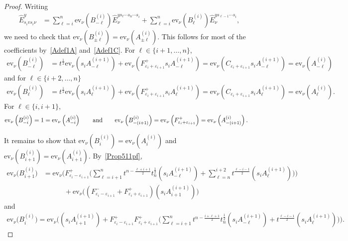 \documentclass[11pt]{article}
\theoremstyle{plain}
\theoremstyle{definition}
\theoremstyle{remark}
\numberwithin{equation}{section}
\def\ev{\mathrm{ev}}
\newcounter{r}
\newcounter{s}
\begin{document}
\begin{proof}
Writing
\begin{align*}
\widehat{E}^y_{s_ivs_i\nu}
&= \sum_{\ell=i}^n \ev_\nu(B^{(i)}_{-\ell})\widehat{E}_\nu^{ys_\ell\cdots s_n\cdots s_i}
+ \sum_{\ell=i}^n \ev_\nu(B^{(i)}_{\ell})\widehat{E}_\nu^{ys_{\ell-1}\cdots s_i},
\end{align*}
we need to check that $\ev_\nu(B^{(i)}_{\pm\ell}) = \ev_\nu(A^{(i)}_{\pm\ell})$. 
This follows for most of the coefficients by~\eqref{Adef1A} and~\eqref{Adef1C}. For $\ell \in \{i+1,\ldots, n\}$,
\begin{align*}
\ev_\nu\left(B^{(i)}_{-\ell}\right)
&= t^{\frac12}\ev_\nu\left(s_iA^{(i+1)}_{-\ell}\right) + \ev_\nu\left(F_{\varepsilon_i+\varepsilon_{i+1}}^+ s_iA^{(i+1)}_{-\ell}\right) 
= \ev_\nu\left(C_{\varepsilon_i+\varepsilon_{i+1}} s_iA^{(i+1)}_{-\ell}\right) 
= \ev_\nu\left(A^{(i)}_{-\ell}\right)
\end{align*}
and for $\ell \in \{i+2,\ldots, n\}$
\begin{align*}
\ev_\nu\left(B^{(i)}_{\ell}\right)
&= t^{\frac12}\ev_\nu \left(s_iA^{(i+1)}_{\ell}\right) + \ev_\nu\left(F_{\varepsilon_i+\varepsilon_{i+1}}^+ s_iA^{(i+1)}_{\ell}\right) 
= \ev_\nu\left(C_{\varepsilon_i+\varepsilon_{i+1}} s_iA^{(i+1)}_{\ell}\right) 
= \ev_\nu\left(A^{(i)}_{\ell}\right).
\end{align*}
For $\ell\in\{i, i+1\}$,
\begin{align*}
\ev_\nu\left(B^{(i)}_{-i}\right) 
&= 1 = \ev_\nu\left(A^{(i)}_{-i}\right) \qquad\hbox{and}\qquad
\ev_\nu\left(B^{(i)}_{-(i+1)} \right) 
=\ev_\nu\left(F_{\varepsilon_i+\varepsilon_{i+1}}^+\right)
=\ev_\nu\left(A^{(i)}_{-(i+1)} \right).
\end{align*}

It remains to show that
$\ev_\nu(B^{(i)}_{i})=\ev_\nu(A^{(i)}_{i})$ and $\ev_\nu(B^{(i)}_{i+1}) = \ev_\nu(A^{(i)}_{i+1})$.
By~\eqref{Prop511pf},
\begin{align*}
\ev_\nu\Big(B^{(i)}_{i+1} \Big)
&= \ev_\nu\Big( F_{\varepsilon_i-\varepsilon_{i+1}}^+ 
\Big(\sum_{\ell = i+1}^n t^{n-\frac{\ell+i+1}{2}} t_n^{\frac12} (s_iA^{(i+1)}_{-\ell})
+\sum_{\ell = n}^{i+2} t^{\frac{\ell-i-1}{2}}  (s_iA^{(i+1)}_{\ell})\Big)\Big)
\\
&\qquad\quad
+ \ev_\nu\Big(\left(F_{\varepsilon_i-\varepsilon_{i+1}}^- +F_{\varepsilon_i+\varepsilon_{i+1}}^+\right)(s_iA^{(i+1)}_{i+1})\Big)
\end{align*}
and 
\begin{align*}
\ev_\nu\Big(B^{(i)}_i \Big)
= \ev_\nu\Big((s_iA^{(i+1)}_{i+1})
+F_{\varepsilon_i-\varepsilon_{i+1}}^+ F_{\varepsilon_i+\varepsilon_{i+1}}^+
\Big(\sum_{\ell=i+1}^n t^{n-\frac{i+\ell+1}{2}}t_n^{\frac12} (s_iA^{(i+1)}_{-\ell}) 
+t^{\frac{\ell-i-1}{2}}(s_iA^{(i+1)}_\ell)\Big)\Big).
\end{align*}


\end{proof}
\end{document}
